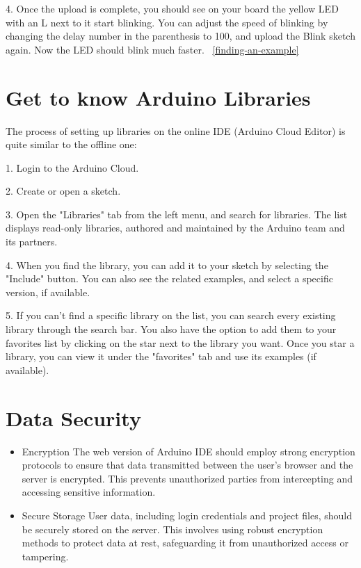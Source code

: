 4. Once the upload is complete, you should see on your board the yellow LED with an L next to it start blinking. You can adjust the speed of blinking by changing the delay number in the parenthesis to 100, and upload the Blink sketch again. Now the LED should blink much faster. ~\ref{finding-an-example}

\section{Get to know Arduino Libraries}

The process of setting up libraries on the online IDE (Arduino Cloud Editor) is quite similar to the offline one:

1. Login to the Arduino Cloud.

2. Create or open a sketch.

3. Open the "Libraries" tab from the left menu, and search for libraries. The list displays read-only libraries, authored and maintained by the Arduino team and its partners.

4. When you find the library, you can add it to your sketch by selecting the "Include" button. You can also see the related examples, and select a specific version, if available.

5. If you can't find a specific library on the list, you can search every existing library through the search bar. You also have the option to add them to your favorites list by clicking on the star next to the library you want. Once you star a library, you can view it under the "favorites" tab and use its examples (if available).

\section{Data Security}

\begin{itemize}
    \item{Encryption}
    The web version of Arduino IDE should employ strong encryption protocols to ensure that data transmitted between the user's browser and the server is encrypted. This prevents unauthorized parties from intercepting and accessing sensitive information.
    
    \item{Secure Storage}
    User data, including login credentials and project files, should be securely stored on the server. This involves using robust encryption methods to protect data at rest, safeguarding it from unauthorized access or tampering.
\end{itemize}

